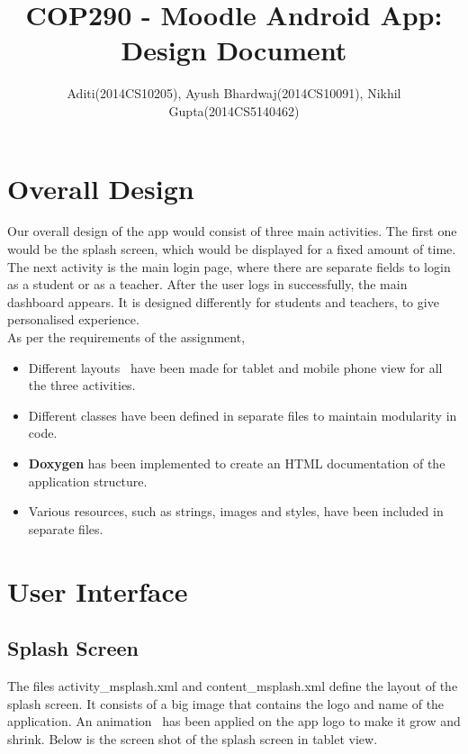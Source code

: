 \documentclass{article}
\begin{document}
\title{COP290 - Moodle Android App: Design Document}
\author{ Aditi(2014CS10205), Ayush Bhardwaj(2014CS10091), Nikhil Gupta(2014CS5140462)}

\maketitle

\section{Overall Design}

Our overall design of the app would consist of three main activities. The first one would be the splash screen, which would be displayed for a fixed amount of time. The next activity is the main login page, where there are separate fields to login as a student or as a teacher. After the user logs in successfully, the main dashboard appears. It is designed differently for students and teachers, to give personalised experience.\\
As per the requirements of the assignment,
\begin{itemize}
\item Different layouts~\cite{multiple_screen_sizes} have been made for tablet and mobile phone view for all the three activities.
\item Different classes have been defined in separate files to maintain modularity in code.
\item \textbf{Doxygen} has been implemented to create an HTML documentation of the application structure.
\item Various resources, such as strings, images and styles, have been included in separate files.
\end{itemize} 

\section{User Interface}
\subsection{Splash Screen} The files activity\_msplash.xml and content\_msplash.xml define the layout of the splash screen. It consists of a big image that contains the logo and name of the application. An animation~\cite{animations} has been applied on the app logo to make it grow and shrink. Below is the screen shot of the splash screen in tablet view. 
\end{document}
